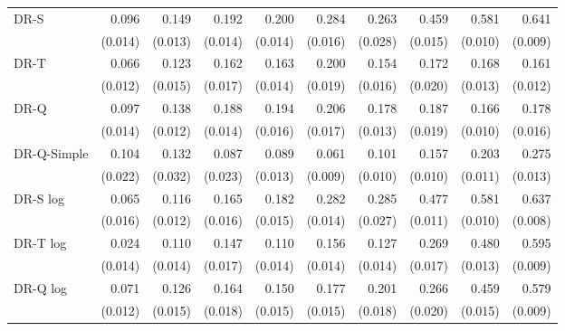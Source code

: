 \begin{tabular}{l|rrrrrrrrr}
\hline
DR-S & 0.096 & 0.149 & 0.192 & 0.200 & 0.284 & 0.263 & 0.459 & 0.581 & 0.641 \\
 & \scriptsize (0.014) & \scriptsize (0.013) & \scriptsize (0.014) & \scriptsize (0.014) & \scriptsize (0.016) & \scriptsize (0.028) & \scriptsize (0.015) & \scriptsize (0.010) & \scriptsize (0.009) \\[2pt]
DR-T & 0.066 & 0.123 & 0.162 & 0.163 & 0.200 & 0.154 & 0.172 & 0.168 & 0.161 \\
 & \scriptsize (0.012) & \scriptsize (0.015) & \scriptsize (0.017) & \scriptsize (0.014) & \scriptsize (0.019) & \scriptsize (0.016) & \scriptsize (0.020) & \scriptsize (0.013) & \scriptsize (0.012) \\[2pt]
DR-Q & 0.097 & 0.138 & 0.188 & 0.194 & 0.206 & 0.178 & 0.187 & 0.166 & 0.178 \\
 & \scriptsize (0.014) & \scriptsize (0.012) & \scriptsize (0.014) & \scriptsize (0.016) & \scriptsize (0.017) & \scriptsize (0.013) & \scriptsize (0.019) & \scriptsize (0.010) & \scriptsize (0.016) \\[2pt]
DR-Q-Simple & 0.104 & 0.132 & 0.087 & 0.089 & 0.061 & 0.101 & 0.157 & 0.203 & 0.275 \\
 & \scriptsize (0.022) & \scriptsize (0.032) & \scriptsize (0.023) & \scriptsize (0.013) & \scriptsize (0.009) & \scriptsize (0.010) & \scriptsize (0.010) & \scriptsize (0.011) & \scriptsize (0.013) \\[2pt]
\hline
DR-S log & 0.065 & 0.116 & 0.165 & 0.182 & 0.282 & 0.285 & 0.477 & 0.581 & 0.637 \\
 & \scriptsize (0.016) & \scriptsize (0.012) & \scriptsize (0.016) & \scriptsize (0.015) & \scriptsize (0.014) & \scriptsize (0.027) & \scriptsize (0.011) & \scriptsize (0.010) & \scriptsize (0.008) \\[2pt]
DR-T log & 0.024 & 0.110 & 0.147 & 0.110 & 0.156 & 0.127 & 0.269 & 0.480 & 0.595 \\
 & \scriptsize (0.014) & \scriptsize (0.014) & \scriptsize (0.017) & \scriptsize (0.014) & \scriptsize (0.014) & \scriptsize (0.014) & \scriptsize (0.017) & \scriptsize (0.013) & \scriptsize (0.009) \\[2pt]
DR-Q log & 0.071 & 0.126 & 0.164 & 0.150 & 0.177 & 0.201 & 0.266 & 0.459 & 0.579 \\
 & \scriptsize (0.012) & \scriptsize (0.015) & \scriptsize (0.018) & \scriptsize (0.015) & \scriptsize (0.015) & \scriptsize (0.018) & \scriptsize (0.020) & \scriptsize (0.015) & \scriptsize (0.009) \\[2pt]

\end{tabular}
